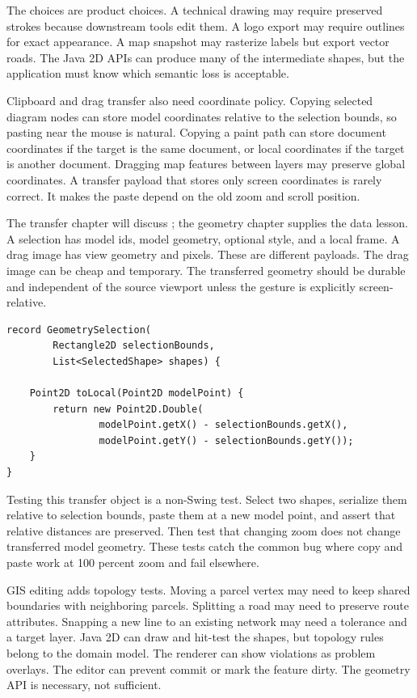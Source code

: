 The choices are product choices. A technical drawing may require preserved strokes because downstream tools edit them. A logo export may require outlines for exact appearance. A map snapshot may rasterize labels but export vector roads. The Java 2D APIs can produce many of the intermediate shapes, but the application must know which semantic loss is acceptable.

Clipboard and drag transfer also need coordinate policy. Copying selected diagram nodes can store model coordinates relative to the selection bounds, so pasting near the mouse is natural. Copying a paint path can store document coordinates if the target is the same document, or local coordinates if the target is another document. Dragging map features between layers may preserve global coordinates. A transfer payload that stores only screen coordinates is rarely correct. It makes the paste depend on the old zoom and scroll position.

The transfer chapter will discuss ; the geometry chapter supplies the data lesson. A selection has model ids, model geometry, optional style, and a local frame. A drag image has view geometry and pixels. These are different payloads. The drag image can be cheap and temporary. The transferred geometry should be durable and independent of the source viewport unless the gesture is explicitly screen-relative.

\begin{lstlisting}[caption={Selection transfer with a local geometry frame.}]
record GeometrySelection(
        Rectangle2D selectionBounds,
        List<SelectedShape> shapes) {

    Point2D toLocal(Point2D modelPoint) {
        return new Point2D.Double(
                modelPoint.getX() - selectionBounds.getX(),
                modelPoint.getY() - selectionBounds.getY());
    }
}
\end{lstlisting}

Testing this transfer object is a non-Swing test. Select two shapes, serialize them relative to selection bounds, paste them at a new model point, and assert that relative distances are preserved. Then test that changing zoom does not change transferred model geometry. These tests catch the common bug where copy and paste work at 100 percent zoom and fail elsewhere.

GIS editing adds topology tests. Moving a parcel vertex may need to keep shared boundaries with neighboring parcels. Splitting a road may need to preserve route attributes. Snapping a new line to an existing network may need a tolerance and a target layer. Java 2D can draw and hit-test the shapes, but topology rules belong to the domain model. The renderer can show violations as problem overlays. The editor can prevent commit or mark the feature dirty. The geometry API is necessary, not sufficient.

